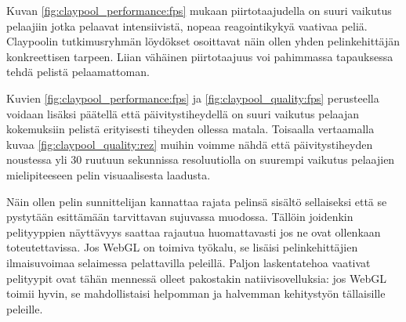 Kuvan \ref{fig:claypool_performance:fps} mukaan piirtotaajudella on suuri vaikutus pelaajiin jotka pelaavat intensiivistä, nopeaa reagointikykyä vaativaa peliä. Claypoolin tutkimusryhmän löydökset\cite{claypool_fps} osoittavat näin ollen yhden pelinkehittäjän konkreettisen tarpeen. Liian vähäinen piirtotaajuus voi pahimmassa tapauksessa tehdä pelistä pelaamattoman.  

Kuvien \ref{fig:claypool_performance:fps} ja \ref{fig:claypool_quality:fps} perusteella voidaan lisäksi päätellä että päivitystiheydellä on suuri vaikutus pelaajan kokemuksiin pelistä erityisesti tiheyden ollessa matala. Toisaalla vertaamalla kuvaa \ref{fig:claypool_quality:rez} muihin voimme nähdä että päivitystiheyden noustessa yli 30 ruutuun sekunnissa resoluutiolla on suurempi vaikutus pelaajien mielipiteeseen pelin visuaalisesta laadusta\cite{claypool_fps}. 

Näin ollen pelin sunnittelijan kannattaa rajata pelinsä sisältö sellaiseksi että se pystytään esittämään tarvittavan sujuvassa muodossa. Tällöin joidenkin pelityyppien näyttävyys saattaa rajautua huomattavasti jos ne ovat ollenkaan toteutettavissa. Jos WebGL on toimiva työkalu, se lisäisi pelinkehittäjien ilmaisuvoimaa selaimessa pelattavilla peleillä. Paljon laskentatehoa vaativat pelityypit ovat tähän mennessä olleet pakostakin natiivisovelluksia: jos WebGL toimii hyvin, se mahdollistaisi helpomman ja halvemman kehitystyön tällaisille peleille.